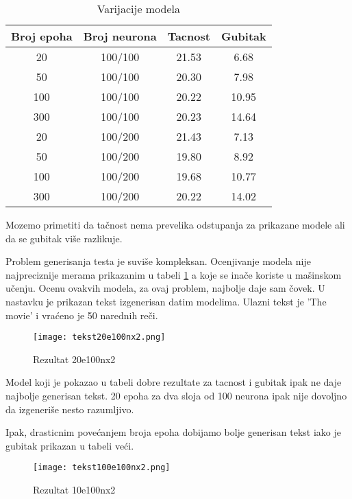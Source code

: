 \documentclass[a4paper]{article}
\begin{document}
\begin{table}[!h]
    \centering
    \begin{tabular}{|| c c c c ||}
    \hline
    Broj epoha & Broj neurona & Tacnost & Gubitak \\
    \hline\hline
     20 & 100/100 & 21.53 & 6.68 \\ 
     50 & 100/100 & 20.30 & 7.98 \\
     100 & 100/100 & 20.22 & 10.95 \\
     300 & 100/100 & 20.23 & 14.64 \\
     20 & 100/200 & 21.43 & 7.13 \\
     50 & 100/200 & 19.80 & 8.92 \\
     100 & 100/200 & 19.68 & 10.77 \\
     300 & 100/200 & 20.22 & 14.02 \\
     \hline
    \end{tabular}
    \caption{Varijacije modela}
    \label{tab:tabela1}
\end{table}


Mozemo primetiti da tačnost nema prevelika odstupanja za prikazane modele ali da se gubitak više razlikuje.

Problem generisanja testa je suviše kompleksan. Ocenjivanje modela nije najpreciznije merama prikazanim u tabeli \ref{tab:tabela1} a koje se inače koriste u mašinskom učenju. Ocenu ovakvih modela, za ovaj problem, najbolje daje sam čovek. U nastavku je prikazan tekst izgenerisan datim modelima.
Ulazni tekst je 'The movie' i vraćeno je 50 narednih reči.

\begin{figure}[htp]
    \centering
    \texttt{[image: tekst20e100nx2.png]}
    \caption{Rezultat 20e100nx2}
    \label{fig:Rezultat20e100n}
\end{figure}

Model koji je pokazao u tabeli dobre rezultate za tacnost i gubitak ipak ne daje najbolje generisan tekst. 20 epoha za dva sloja od 100 neurona ipak nije dovoljno da izgeneriše nesto razumljivo.

Ipak, drasticnim povećanjem broja epoha dobijamo bolje generisan tekst iako je gubitak prikazan u tabeli veći.

\begin{figure}[htp]
    \centering
    \texttt{[image: tekst100e100nx2.png]}
    \caption{Rezultat 10e100nx2}
    \label{fig:Rezultat100e100n}
\end{figure}
\end{document}
